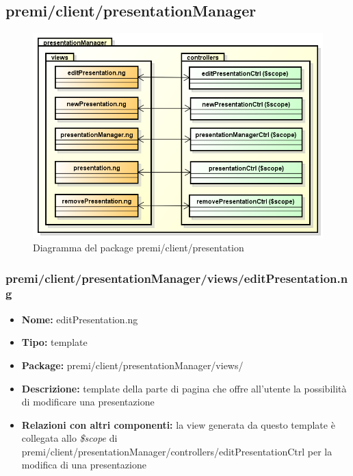 \subsection{premi/client/presentationManager}
\begin{figure}[!h]
\begin{center}
\includegraphics[scale=0.45]{img/diapkg/presentationManager.png}
\caption{Diagramma del package premi/client/presentation}
\end{center}
\end{figure}


\subsubsection{premi/client/presentationManager/views/editPresentation.ng}
\begin{itemize}
  \item[] \textbf{Nome:} editPresentation.ng
  \item[] \textbf{Tipo:} template
  \item[] \textbf{Package:}  premi/client/presentationManager/views/
  \item[] \textbf{Descrizione:} template della parte di pagina che offre all'utente la possibilità di modificare una presentazione
  \item[] \textbf{Relazioni con altri componenti:}  la view generata da questo template è collegata allo \textit{\$scope} di premi/client/presentationManager/controllers/editPresentationCtrl per la modifica di una presentazione
\end{itemize}

